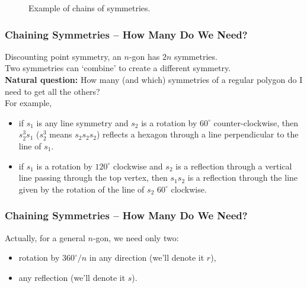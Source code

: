 \documentclass[aspectratio=169,11pt,svgnames]{beamer}
\begin{document}
\begin{frame}
\begin{figure}[H]
\begin{subfigure}[b]{\textwidth}
  \end{subfigure}
  \caption*{Example of chains of symmetries.}
 \end{figure}
\end{frame}

\begin{frame}
 \frametitle{Chaining Symmetries -- How Many Do We Need?}
 Discounting point symmetry, an $n$-gon has \alert{$2n$} symmetries.\\
 \pause
 Two symmetries can `combine' to create a different symmetry.\\
 \pause
 \textbf{Natural question:} How many (and which) symmetries of a regular polygon
  do I need to get all the others?\\
  \pause
  For example,
  \begin{itemize}[label=\textbullet,topsep=0pt]
   \item if $s_1$ is any line symmetry and $s_2$ is a rotation by $60^{ \circ }$
    counter-clockwise, then $s_2^3s_1$ ($s_2^3$ means $s_2s_2s_2$) reflects a
    hexagon through a line perpendicular to the line of $s_1$.
   \pause
   \item if $s_1$ is a rotation by $120^{ \circ }$ clockwise and $s_2$ is a
    reflection through a vertical line passing through the top vertex, then
    $s_1s_2$ is a reflection through the line given by the rotation of the line
    of $s_2$ $60^{ \circ }$ clockwise.
  \end{itemize}
\end{frame}

\begin{frame}
 \frametitle{Chaining Symmetries -- How Many Do We Need?}
 Actually, for a general $n$-gon, we need only \alert{two}:
 \pause
 \begin{itemize}[label=\textbullet,topsep=0pt]
  \item rotation by $360^{ \circ } / n$ in any direction (we'll denote it $r$),
  \pause
  \item any reflection (we'll denote it $s$).
 \end{itemize}
\end{frame}
\end{document}
